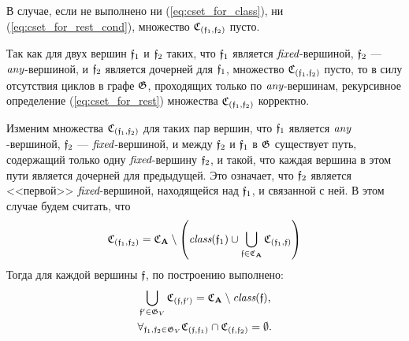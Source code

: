 В случае, если не выполнено ни (\ref{eq:cset_for_class}), ни (\ref{eq:cset_for_rest_cond}), множество $\mathfrak{C}_{(\mathfrak{f}_1, \mathfrak{f}_2)}$ пусто.

Так как для двух вершин $\mathfrak{f}_1$ и $\mathfrak{f}_2$ таких, что $\mathfrak{f}_1$ является $\textit{fixed}$-вершиной, $\mathfrak{f}_2$ --- $\textit{any}$-вершиной, и $\mathfrak{f}_2$ является дочерней для $\mathfrak{f}_1$, множество $\mathfrak{C}_{(\mathfrak{f}_1, \mathfrak{f}_2)}$ пусто, то в силу отсутствия циклов в графе $\mathfrak{G}$, проходящих только по $\textit{any}$-вершинам, рекурсивное определение (\ref{eq:cset_for_rest}) множества $\mathfrak{C}_{(\mathfrak{f}_1, \mathfrak{f}_2)}$ корректно.


Изменим множества $\mathfrak{C}_{(\mathfrak{f}_1, \mathfrak{f}_2)}$ для таких пар вершин, что $\mathfrak{f}_1$ является $\textit{any}$-вершиной, $\mathfrak{f}_2$ --- $\textit{fixed}$-вершиной, и между $\mathfrak{f}_2$ и $\mathfrak{f}_1$ в $\mathfrak{G}$ существует путь, содержащий только одну $\textit{fixed}$-вершину $\mathfrak{f}_2$, и такой, что каждая вершина в этом пути является дочерней для предыдущей. Это означает, что $\mathfrak{f}_2$ является <<первой>> $\textit{fixed}$-вершиной, находящейся над $\mathfrak{f}_1$, и связанной с ней. В этом случае будем считать, что
\begin{equation}
\mathfrak{C}_{(\mathfrak{f}_1, \mathfrak{f}_2)} = \mathfrak{C}_{\mathbf{A}} \setminus \left( \textit{class}(\mathfrak{f}_1) \cup \bigcup_{\mathfrak{f} \in \mathfrak{C}_{\mathbf{A}}} \mathfrak{C}_{(\mathfrak{f}_1, \mathfrak{f})} \right)
\end{equation}
Тогда для каждой вершины $\mathfrak{f}$, по построению выполнено:
\begin{equation}\label{eq:gc_props}
\begin{aligned}
&\bigcup_{\mathfrak{f}' \in \mathfrak{G}_V} \mathfrak{C}_{(\mathfrak{f}, \mathfrak{f}')} = \mathfrak{C}_{\mathbf{A}} \setminus \textit{class}(\mathfrak{f}) \text{,} \\
&\forall_{\mathfrak{f}_1, \mathfrak{f}_2 \in \mathfrak{G}_V} \mathfrak{C}_{(\mathfrak{f}, \mathfrak{f}_1)} \cap \mathfrak{C}_{(\mathfrak{f}, \mathfrak{f}_2)} = \emptyset \text{.}
\end{aligned}
\end{equation}

